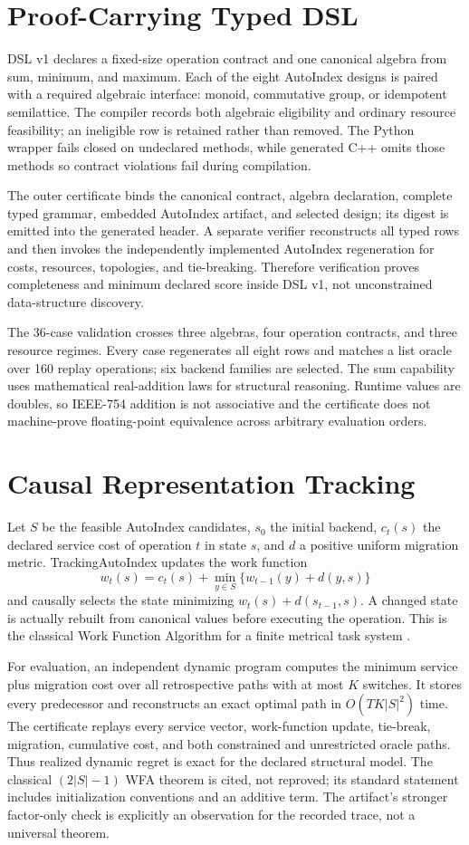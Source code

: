 \documentclass[10pt]{article}
\begin{document}
\section{Proof-Carrying Typed DSL}
DSL v1 declares a fixed-size operation contract and one canonical algebra from
sum, minimum, and maximum. Each of the eight AutoIndex designs is paired with
a required algebraic interface: monoid, commutative group, or idempotent
semilattice. The compiler records both algebraic eligibility and ordinary
resource feasibility; an ineligible row is retained rather than removed.
The Python wrapper fails closed on undeclared methods, while generated C++
omits those methods so contract violations fail during compilation.

The outer certificate binds the canonical contract, algebra declaration,
complete typed grammar, embedded AutoIndex artifact, and selected design; its
digest is emitted into the generated header. A separate verifier reconstructs
all typed rows and
then invokes the independently implemented AutoIndex regeneration for costs,
resources, topologies, and tie-breaking. Therefore verification proves
completeness and minimum declared score inside DSL v1, not unconstrained
data-structure discovery.

The 36-case validation crosses three algebras, four operation contracts, and
three resource regimes. Every case regenerates all eight rows and matches a
list oracle over 160 replay operations; six backend families are selected.
The sum capability uses mathematical real-addition laws for structural
reasoning. Runtime values are doubles, so IEEE-754 addition is not associative
and the certificate does not machine-prove floating-point equivalence across
arbitrary evaluation orders.

\section{Causal Representation Tracking}
Let $S$ be the feasible AutoIndex candidates, $s_0$ the initial backend,
$c_t(s)$ the declared service cost of operation $t$ in state $s$, and $d$ a
positive uniform migration metric. TrackingAutoIndex updates the work function
\[
w_t(s)=c_t(s)+\min_{y\in S}\{w_{t-1}(y)+d(y,s)\}
\]
and causally selects the state minimizing
$w_t(s)+d(s_{t-1},s)$. A changed state is actually rebuilt from canonical
values before executing the operation. This is the classical Work Function
Algorithm for a finite metrical task system \cite{borodin1992}.

For evaluation, an independent dynamic program computes the minimum service
plus migration cost over all retrospective paths with at most $K$ switches.
It stores every predecessor and reconstructs an exact optimal path in
$O(TK|S|^2)$ time. The certificate replays every service vector, work-function
update, tie-break, migration, cumulative cost, and both constrained and
unrestricted oracle paths. Thus realized dynamic regret is exact for the
declared structural model. The classical $(2|S|-1)$ WFA theorem is cited, not
reproved; its standard statement includes initialization conventions and an
additive term. The artifact's stronger factor-only check is explicitly an
observation for the recorded trace, not a universal theorem.
\end{document}
